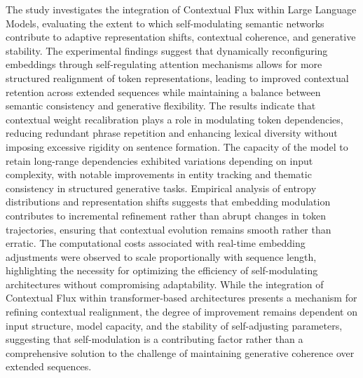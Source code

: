 \documentclass{article}
\begin{document}
The study investigates the integration of Contextual Flux within Large Language Models, evaluating the extent to which self-modulating semantic networks contribute to adaptive representation shifts, contextual coherence, and generative stability. The experimental findings suggest that dynamically reconfiguring embeddings through self-regulating attention mechanisms allows for more structured realignment of token representations, leading to improved contextual retention across extended sequences while maintaining a balance between semantic consistency and generative flexibility. The results indicate that contextual weight recalibration plays a role in modulating token dependencies, reducing redundant phrase repetition and enhancing lexical diversity without imposing excessive rigidity on sentence formation. The capacity of the model to retain long-range dependencies exhibited variations depending on input complexity, with notable improvements in entity tracking and thematic consistency in structured generative tasks. Empirical analysis of entropy distributions and representation shifts suggests that embedding modulation contributes to incremental refinement rather than abrupt changes in token trajectories, ensuring that contextual evolution remains smooth rather than erratic. The computational costs associated with real-time embedding adjustments were observed to scale proportionally with sequence length, highlighting the necessity for optimizing the efficiency of self-modulating architectures without compromising adaptability. While the integration of Contextual Flux within transformer-based architectures presents a mechanism for refining contextual realignment, the degree of improvement remains dependent on input structure, model capacity, and the stability of self-adjusting parameters, suggesting that self-modulation is a contributing factor rather than a comprehensive solution to the challenge of maintaining generative coherence over extended sequences.




\end{document}
